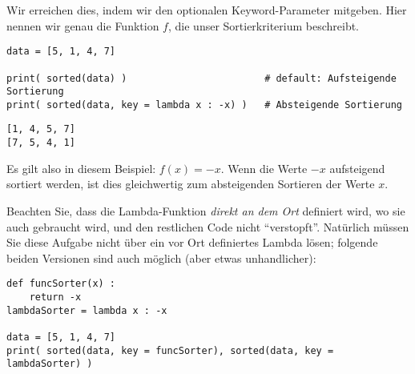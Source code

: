 Wir erreichen dies, indem wir  den optionalen Keyword-Parameter  mitgeben. Hier nennen wir genau die Funktion $f$, die unser Sortierkriterium beschreibt.

\begin{codebox}
\begin{verbatim}
data = [5, 1, 4, 7]

print( sorted(data) )                        # default: Aufsteigende Sortierung
print( sorted(data, key = lambda x : -x) )   # Absteigende Sortierung
\end{verbatim}
\end{codebox}
\begin{cmdbox}
\begin{verbatim}
[1, 4, 5, 7]
[7, 5, 4, 1]
\end{verbatim}
\end{cmdbox}

Es gilt also in diesem Beispiel: $f(x) = -x$. Wenn die Werte $-x$ aufsteigend sortiert werden, ist dies gleichwertig zum absteigenden Sortieren der Werte $x$.

Beachten Sie, dass die Lambda-Funktion \emph{direkt an dem Ort} definiert wird, wo sie auch gebraucht wird, und den restlichen Code nicht \enquote{verstopft}. Natürlich müssen Sie diese Aufgabe nicht über ein vor Ort definiertes Lambda lösen; folgende beiden Versionen sind auch möglich (aber etwas unhandlicher):

\begin{codebox}
\begin{verbatim}
def funcSorter(x) :
    return -x
lambdaSorter = lambda x : -x

data = [5, 1, 4, 7]
print( sorted(data, key = funcSorter), sorted(data, key = lambdaSorter) )
\end{verbatim}
\end{codebox}